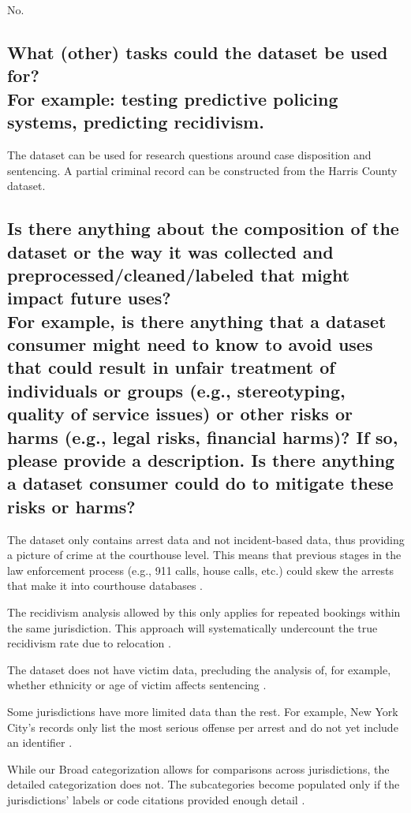 \documentclass[letterpaper, 10 pt, conference]{ieeeconf}  %
\newcommand{\subtitle}[1]{{\\ \small \normalfont \color{purple} #1}}
\begin{document}
No.

\subsection{What (other) tasks could the dataset be used for? \subtitle{For example: testing predictive policing systems, predicting recidivism.}}

The dataset can be used for research questions around case disposition and sentencing. A partial criminal record can be constructed from the Harris County dataset. 

\subsection{Is there anything about the composition of the dataset or the way it was collected and preprocessed/cleaned/labeled that might impact future uses? \subtitle{For example, is there anything that a dataset consumer might need to know to avoid uses that could result in unfair treatment of individuals or groups (e.g., stereotyping, quality of service issues) or other risks or harms (e.g., legal risks, financial harms)? If so, please provide a description. Is there anything a dataset consumer could do to mitigate these risks or harms?}}

The dataset only contains arrest data and not incident-based data, thus providing a picture of crime at the courthouse level. This means that previous stages in the law enforcement process (e.g., 911 calls, house calls, etc.) could skew the arrests that make it into courthouse databases  \cite{ormachea2015new}. 


The recidivism analysis allowed by this only applies for repeated bookings within the same jurisdiction. This approach will systematically undercount the true recidivism rate due to relocation  \cite{ormachea2015new}.


The dataset does not have victim data, precluding the analysis of, for example, whether ethnicity or age of victim affects sentencing  \cite{ormachea2015new}.


Some jurisdictions have more limited data than the rest. For example, New York City’s records only list the most serious offense per arrest and do not yet include an identifier \cite{ormachea2015new}. 

While our Broad categorization allows for comparisons across jurisdictions, the detailed categorization does not. The subcategories become populated only if the jurisdictions’ labels or code
citations provided enough detail \cite{ormachea2015new}.
\end{document}
